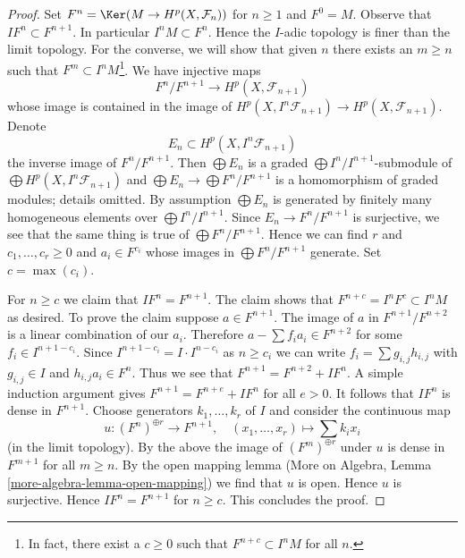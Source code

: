 \begin{proof}
Set $F^n = \Ker(M \to H^p(X, \mathcal{F}_n))$ for $n \geq 1$ and $F^0 = M$.
Observe that $I F^n \subset F^{n + 1}$. In particular $I^n M \subset F^n$.
Hence the $I$-adic topology is finer than the limit topology. For
the converse, we will show that given $n$
there exists an $m \geq n$ such that $F^m \subset I^nM$\footnote{In fact,
there exist a $c \geq 0$ such that $F^{n + c} \subset I^nM$ for all $n$.}.
We have injective maps
$$
F^n/F^{n + 1} \longrightarrow H^p(X, \mathcal{F}_{n + 1})
$$
whose image is contained in the image of
$H^p(X, I^n\mathcal{F}_{n + 1}) \to H^p(X, \mathcal{F}_{n + 1})$.
Denote
$$
E_n \subset H^p(X, I^n\mathcal{F}_{n + 1})
$$
the inverse image of $F^n/F^{n + 1}$. Then $\bigoplus E_n$ is
a graded $\bigoplus I^n/I^{n + 1}$-submodule of
$\bigoplus H^p(X, I^n\mathcal{F}_{n + 1})$ and
$\bigoplus E_n \to \bigoplus F^n/F^{n + 1}$ is a homomorphism of graded
modules; details omitted. By assumption $\bigoplus E_n$ is generated by
finitely many homogeneous elements over $\bigoplus I^n/I^{n + 1}$.
Since $E_n \to F^n/F^{n + 1}$ is surjective, we see that
the same thing is true of $\bigoplus F^n/F^{n + 1}$.
Hence we can find $r$ and $c_1, \ldots, c_r \geq 0$ and
$a_i \in F^{c_i}$ whose images in $\bigoplus F^n/F^{n + 1}$ generate.
Set $c = \max(c_i)$.

\medskip\noindent
For $n \geq c$ we claim that $I F^n = F^{n + 1}$. The claim shows that
$F^{n + c} = I^nF^c \subset I^nM$ as desired. To prove the claim
suppose $a \in F^{n + 1}$. The image of
$a$ in $F^{n + 1}/F^{n + 2}$ is a linear combination
of our $a_i$. Therefore $a  - \sum f_i a_i \in F^{n + 2}$
for some $f_i \in I^{n + 1 - c_i}$. Since
$I^{n + 1 - c_i} = I \cdot I^{n - c_i}$ as $n \geq c_i$ we can write
$f_i = \sum g_{i, j} h_{i, j}$ with $g_{i, j} \in I$
and $h_{i, j}a_i \in F^n$. Thus we see that
$F^{n + 1} = F^{n + 2} + IF^n$.
A simple induction argument gives $F^{n + 1} = F^{n + e} + IF^n$
for all $e > 0$. It follows that $IF^n$ is dense in $F^{n + 1}$.
Choose generators $k_1, \ldots, k_r$ of $I$ and consider
the continuous map
$$
u : (F^n)^{\oplus r} \longrightarrow F^{n + 1},\quad
(x_1, \ldots, x_r) \mapsto \sum k_i x_i
$$
(in the limit topology).
By the above the image of $(F^m)^{\oplus r}$ under $u$ is dense in
$F^{m + 1}$ for all $m \geq n$. By the open mapping lemma
(More on Algebra, Lemma \ref{more-algebra-lemma-open-mapping}) we find
that $u$ is open. Hence $u$ is surjective. Hence $IF^n = F^{n + 1}$
for $n \geq c$. This concludes the proof.
\end{proof}

